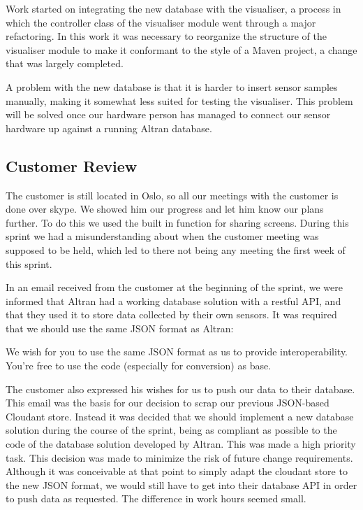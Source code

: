 \documentclass[../document]{subfiles}
\begin{document}
Work started on integrating the new database with the visualiser, a process in which the controller class of the visualiser module went through a major refactoring. In this work it was necessary to reorganize the structure of the visualiser module to make it conformant to the style of a Maven project, a change that was largely completed.

A problem with the new database is that it is harder to insert sensor samples manually, making it somewhat less suited for testing the visualiser. This problem will be solved once our hardware person has managed to connect our sensor hardware up against a running \gls{Altran} database.

\subsection{Customer Review}
The customer is still located in Oslo, so all our meetings with the customer is done over skype. We showed him our progress and let him know our plans further. To do this we used the built in function for sharing screens. During this sprint we had a misunderstanding about when the customer meeting was supposed to be held, which led to there not being any meeting the first week of this sprint.

In an email received from the customer at the beginning of the sprint, we were informed that \gls{Altran} had a working database solution with a restful API, and that they used it to store data collected by their own sensors. It was required that we should use the same \gls{JSON} format as \gls{Altran}:

\begin{italicquotation}
We wish for you to use the same \gls{JSON} format as us to provide interoperability. You’re free to use the code (especially for conversion) as base.
\end{italicquotation}

The customer also expressed his wishes for us to push our data to their database. This email was the basis for our decision to scrap our previous \gls{JSON}-based Cloudant store. Instead it was decided that we should implement a new database solution during the course of the sprint, being as compliant as possible to the code of the database solution developed by \gls{Altran}. This was made a high priority task. This decision was made to minimize the risk of future change requirements. Although it was conceivable at that point to simply adapt the cloudant store to the new \gls{JSON} format, we would still have to get into their database API in order to push data as requested. The difference in work hours seemed small.
\end{document}

